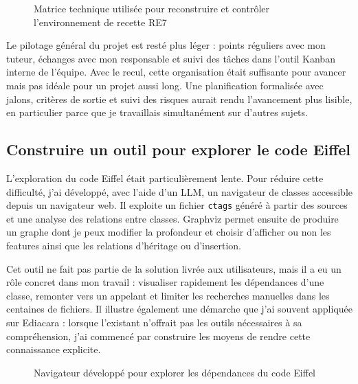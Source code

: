 \begin{figure}[H]
\centering
{}
\caption{Matrice technique utilisée pour reconstruire et contrôler l'environnement de recette RE7}
\label{fig:matrice-re7}
\end{figure}

Le pilotage général du projet est resté plus léger : points réguliers avec mon tuteur, échanges avec mon responsable et suivi des tâches dans l'outil Kanban interne de l'équipe. Avec le recul, cette organisation était suffisante pour avancer mais pas idéale pour un projet aussi long. Une planification formalisée avec jalons, critères de sortie et suivi des risques aurait rendu l'avancement plus lisible, en particulier parce que je travaillais simultanément sur d'autres sujets.

\subsection{Construire un outil pour explorer le code Eiffel}

L'exploration du code Eiffel était particulièrement lente. Pour réduire cette difficulté, j'ai développé, avec l'aide d'un LLM, un navigateur de classes accessible depuis un navigateur web. Il exploite un fichier \texttt{ctags} généré à partir des sources et une analyse des relations entre classes. Graphviz permet ensuite de produire un graphe dont je peux modifier la profondeur et choisir d'afficher ou non les features ainsi que les relations d'héritage ou d'insertion.

Cet outil ne fait pas partie de la solution livrée aux utilisateurs, mais il a eu un rôle concret dans mon travail : visualiser rapidement les dépendances d'une classe, remonter vers un appelant et limiter les recherches manuelles dans les centaines de fichiers. Il illustre également une démarche que j'ai souvent appliquée sur Ediacara : lorsque l'existant n'offrait pas les outils nécessaires à sa compréhension, j'ai commencé par construire les moyens de rendre cette connaissance explicite.

\begin{figure}[H]
\centering
{}
\caption{Navigateur développé pour explorer les dépendances du code Eiffel}
\label{fig:navigateur-eiffel}
\end{figure}

